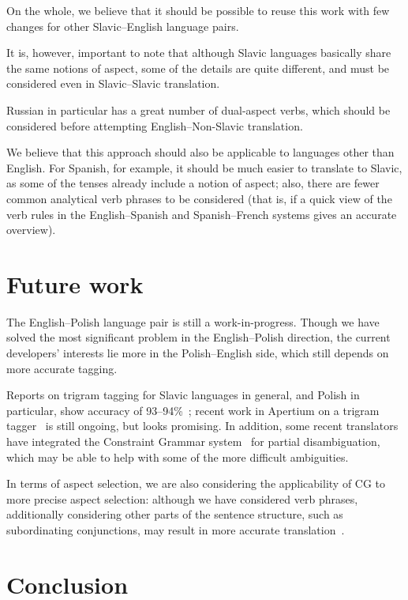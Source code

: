 \documentclass[11pt]{article}
\begin{document}
On the whole, we believe that it should be possible to reuse this
work with few changes for other Slavic--English language pairs.

It is, however, important to note that although Slavic languages
basically share the same notions of aspect, some of the details are
quite different, and must be considered even in Slavic--Slavic
translation.

Russian in particular has a great number of dual-aspect verbs, which
should be considered before attempting English--Non-Slavic translation.

We believe that this approach should also be applicable to languages
other than English. For Spanish, for example, it should be much easier
to translate to Slavic, as some of the tenses already include a notion
of aspect; also, there are fewer common analytical verb phrases to
be considered (that is, if a quick view of the verb rules in the
English--Spanish and Spanish--French systems gives an accurate overview).

\section{Future work}
The English--Polish language pair is still a work-in-progress. Though
we have solved the most significant problem in the English--Polish
direction, the current developers' interests lie more in the 
Polish--English side, which still depends on more accurate tagging.

Reports on trigram tagging for Slavic languages in general, and Polish in 
particular, show accuracy of 93--94\%~\cite{HajicKKOP01,Debowski04}; recent
work in Apertium on a trigram tagger~\cite{sheikh2009trigram} is still
ongoing, but looks promising. In addition, some recent translators
have integrated the Constraint Grammar system~\cite{karlsson1990cgf} for
partial disambiguation, which may be able to help with some of the
more difficult ambiguities.

In terms of aspect selection, we are also considering the applicability
of CG to more precise aspect selection: although we have considered
verb phrases, additionally considering other parts of the sentence 
structure, such as subordinating conjunctions, may result in more
accurate translation~\cite{kupsc03,kupsc03a}.

\section{Conclusion}
\end{document}
